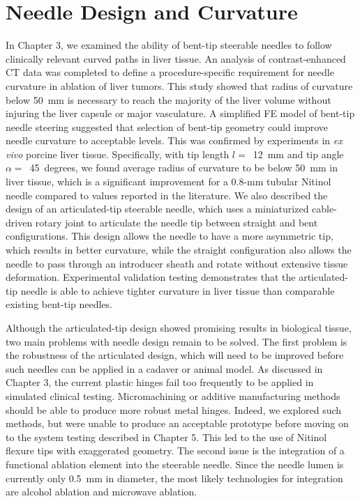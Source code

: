 \section{Needle Design and Curvature}
In Chapter 3, we examined the ability of bent-tip steerable needles to follow clinically relevant curved paths in liver tissue. An analysis of contrast-enhanced CT data was completed to define a procedure-specific requirement for needle curvature in ablation of liver tumors. This study showed that radius of curvature below 50~mm is necessary to reach the majority of the liver volume without injuring the liver capsule or major vasculature. A simplified FE model of bent-tip needle steering suggested that selection of bent-tip geometry could improve needle curvature to acceptable levels. This was confirmed by experiments in \textit{ex vivo} porcine liver tissue. Specifically, with tip length $l =$~12~mm and tip angle $\alpha =$~45~degrees, we found average radius of curvature to be below 50~mm in liver tissue, which is a significant improvement for a 0.8-mm tubular Nitinol needle compared to values reported in the literature. We also described the design of an articulated-tip steerable needle, which uses a miniaturized cable-driven rotary joint to articulate the needle tip between straight and bent configurations. This design allows the needle to have a more asymmetric tip, which results in better curvature, while the straight configuration also allows the needle to pass through an introducer sheath and rotate without extensive tissue deformation. Experimental validation testing demonstrates that the articulated-tip needle is able to achieve tighter curvature in liver tissue than comparable existing bent-tip needles. 

Although the articulated-tip design showed promising results in biological tissue, two main problems with needle design remain to be solved. The first problem is the robustness of the articulated design, which will need to be improved before such needles can be applied in a cadaver or animal model. As discussed in Chapter 3, the current plastic hinges fail too frequently to be applied in simulated clinical testing. Micromachining or additive manufacturing methods should be able to produce more robust metal hinges. Indeed, we explored such methods, but were unable to produce an acceptable prototype before moving on to the system testing described in Chapter 5. This led to the use of Nitinol flexure tips with exaggerated geometry. The second issue is the integration of a functional ablation element into the steerable needle. Since the needle lumen is currently only 0.5~mm in diameter, the most likely technologies for integration are alcohol ablation and microwave ablation.  

